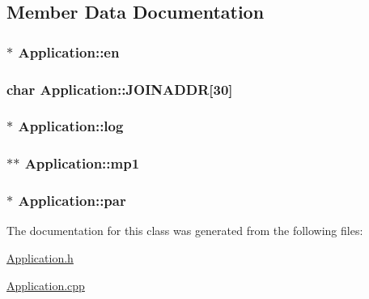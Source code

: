 \subsection{\-Member \-Data \-Documentation}
\hypertarget{class_application_a96273af089eddb43c743f6386ca3938c}{
\subsubsection[{en}]{$\ast$ {\bf \-Application\-::en}}}\label{de/d6b/class_application_a96273af089eddb43c743f6386ca3938c}
\hypertarget{class_application_acca96da4be60c3bc3018337cc6233e46}{
\subsubsection[{\-J\-O\-I\-N\-A\-D\-D\-R}]{\setlength{\rightskip}{0pt plus 5cm}char {\bf \-Application\-::\-J\-O\-I\-N\-A\-D\-D\-R}\mbox{[}30\mbox{]}}}\label{de/d6b/class_application_acca96da4be60c3bc3018337cc6233e46}
\hypertarget{class_application_a92d6f9eb17704ca7a7d28862faa4cbd0}{
\subsubsection[{log}]{$\ast$ {\bf \-Application\-::log}}}\label{de/d6b/class_application_a92d6f9eb17704ca7a7d28862faa4cbd0}
\hypertarget{class_application_a858c988b6be86ab4d6d41b044d15ef1a}{
\subsubsection[{mp1}]{$\ast$$\ast$ {\bf \-Application\-::mp1}}}\label{de/d6b/class_application_a858c988b6be86ab4d6d41b044d15ef1a}
\hypertarget{class_application_aca640b0742d1f5325a031584a9224a00}{
\subsubsection[{par}]{$\ast$ {\bf \-Application\-::par}}}\label{de/d6b/class_application_aca640b0742d1f5325a031584a9224a00}


\-The documentation for this class was generated from the following files\-:\begin{DoxyCompactItemize}
\item 
\hyperlink{_application_8h}{\-Application.\-h}\item 
\hyperlink{_application_8cpp}{\-Application.\-cpp}\end{DoxyCompactItemize}
